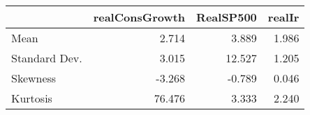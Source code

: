 \begin{tabular}{lrrr}
\toprule
{} &  realConsGrowth &  RealSP500 &  realIr \\
\midrule
Mean          &           2.714 &      3.889 &   1.986 \\
Standard Dev. &           3.015 &     12.527 &   1.205 \\
Skewness      &          -3.268 &     -0.789 &   0.046 \\
Kurtosis      &          76.476 &      3.333 &   2.240 \\
\bottomrule
\end{tabular}
